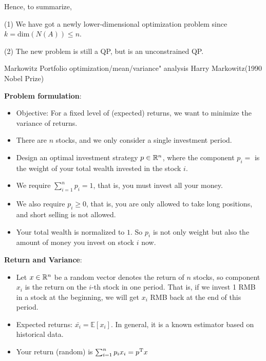 Hence, to summarize,

(1) We have got a newly lower-dimensional optimization problem since $k =\text{dim}(N(A)) \leq n $.

(2) The new problem is still a QP, but is an unconstrained QP.



\begin{example}{Markowitz Portfolio optimization/mean/variance" analysis}  Harry Markowitz(1990 Nobel Prize)
	
	
	\textbf{Problem formulation}: 
	\begin{itemize}
		\item Objective: For a fixed level of (expected) returns, we want to minimize the variance of returns.
		
		\item There are $n$ stocks, and we only consider a single investment period.\\
		
		\item Design an optimal investment strategy $p\in \mathbb{R}^n$, where the component $p_i = $ is the weight of your total wealth invested in the stock $i$.
		
		\item We require $\sum^n_{i=1}p_i = 1$, that is, you must invest all your money.
		
		\item We also require $p_i \geq 0$, that is, you are only allowed to take long positions, and short selling is not allowed.
		
		\item Your total wealth is normalized to $1$. So $p_i$ is not only weight but also the amount of money you invest on stock $i$ now.
	\end{itemize} 
	
	\textbf{Return and Variance}:
	
	\begin{itemize}
		\item Let $x\in \mathbb{R}^n$ be a random vector denotes the return of $n$ stocks, so component $x_i$ is the return on the $i$-th stock in one period. That is, if we invest 1 RMB in a stock at the beginning, we will get $x_i$ RMB back at the end of this period.

		\item Expected returns: $\bar{x_i} = \mathbb{E}[x_i]$. In general, it is a known estimator based on historical data.
		
		\item Your return (random) is $\sum^n_{i=1}p_ix_i = p^{{\rm T}}x$
		

\end{itemize}
\end{example}
